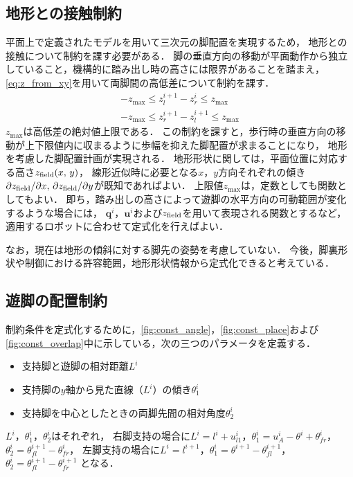 \documentclass[autodetect-engine,dvipdfmx-if-dvi,ja=standard,a4j,jbase=11pt,magstyle=nomag*]{bxjsreport}
\begin{document}
\subsection{地形との接触制約}
\label{subseq:field_contact_constraint}
平面上で定義されたモデルを用いて三次元の脚配置を実現するため，
地形との接触について制約を課す必要がある．
脚の垂直方向の移動が平面動作から独立していること，機構的に踏み出し時の高さには限界があることを踏まえ，
\cref{eq:z_from_xy}を用いて両脚間の高低差について制約を課す．
\begin{equation} \label{eq:z_field_const}
    \begin{gathered}
        -z_{\mathrm{max}} \leq z_l^{i + 1} - z_r^i \leq z_{\mathrm{max}} \\
        -z_{\mathrm{max}} \leq z_r^{i + 1} - z_l^{i + 1} \leq z_{\mathrm{max}}
    \end{gathered}
\end{equation}
$z_{\mathrm{max}}$は高低差の絶対値上限である．
この制約を課すと，歩行時の垂直方向の移動が上下限値内に収まるように歩幅を抑えた脚配置が求まることになり，
地形を考慮した脚配置計画が実現される．
地形形状に関しては，平面位置に対応する高さ$z_{\mathrm{field}} ( x ,\, y )$，
線形近似時に必要となる$x$，$y$方向それぞれの傾き$\partial z_{\mathrm{field}} / \partial x ,\, \partial z_{\mathrm{field}} / \partial y$が既知であればよい．
上限値$z_{\mathrm{max}}$は，定数としても関数としてもよい．
即ち，踏み出しの高さによって遊脚の水平方向の可動範囲が変化するような場合には，
$\bm{q}^i$，$\bm{u}^i$および$z_{\mathrm{field}}$を用いて表現される関数とするなど，
適用するロボットに合わせて定式化を行えばよい．

なお，現在は地形の傾斜に対する脚先の姿勢を考慮していない．
今後，脚裏形状や制御における許容範囲，地形形状情報から定式化できると考えている．



\subsection{遊脚の配置制約}
制約条件を定式化するために，\cref{fig:const_angle}，\cref{fig:const_place}および\cref{fig:const_overlap}中に示している，次の三つのパラメータを定義する．
\begin{itemize}
    \item 支持脚と遊脚の相対距離$L^i$
    \item 支持脚の$y$軸から見た直線（$L^i$）の傾き$\theta_1^i$
    \item 支持脚を中心としたときの両脚先間の相対角度$\theta_2^i$
\end{itemize}
$L^i$，$\theta_1^i$，$\theta_2^i$はそれぞれ，
右脚支持の場合に$L^i = l^i + u_{l1}^i$，$\theta_1^i = u_A^i - \theta^i + \theta_{fr}^i$，$\theta_2^i = \theta_{fl}^{i + 1} - \theta_{fr}^i$，
左脚支持の場合に$L^i = l^{i + 1}$，$\theta_1^i = \theta^{i + 1} - \theta_{fl}^{i + 1}$，$\theta_2^i = \theta_{fl}^{i + 1} - \theta_{fr}^{i + 1}$
となる．
\end{document}
